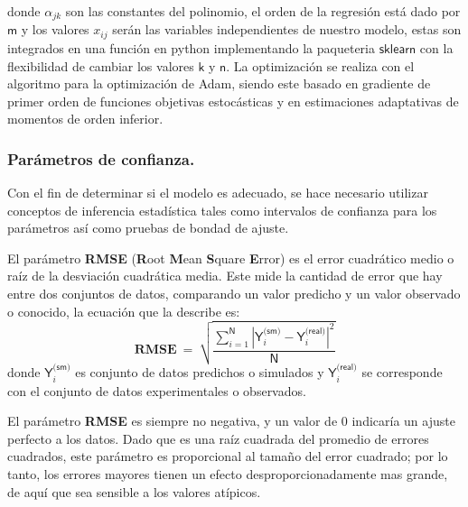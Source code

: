 donde $\alpha_{jk}$ son las constantes del polinomio, el orden de la regresión está dado por $\textsf{m}$ y los valores $x_{ij}$ serán las variables independientes de nuestro modelo, estas son integrados en una función en python implementando la paqueteria $\textsf{sklearn}$ con la flexibilidad de cambiar los valores $\textsf{k}$ y $\textsf{n}$. %
La optimización se realiza con el algoritmo para la optimización de Adam\citep{adam}, siendo este basado en gradiente de primer orden de funciones objetivas estocásticas y en estimaciones adaptativas de momentos de orden inferior.

\subsubsection{Parámetros de confianza.}
Con el fin de determinar si el modelo es adecuado, se hace necesario utilizar conceptos de inferencia estadística tales como intervalos de confianza para los parámetros así como pruebas de bondad de ajuste. 

El parámetro \textbf{RMSE} (\textbf{R}oot \textbf{M}ean \textbf{S}quare \textbf{E}rror) es el error cuadrático medio o raíz de la desviación cuadrática media. Este mide la cantidad de error que hay entre dos conjuntos de datos, comparando un valor predicho y un valor observado o conocido, la ecuación que la describe es:
\begin{equation}
\mathbf{RMSE} ~ = ~ \sqrt{\dfrac{\sum\limits_{i=1}^\textsf{N} |\textsf{Y}_{i}^\textsf{(sm)}  - \textsf{Y}_{i}^\textsf{(real)}|^2}{\textsf{N}}} 
\end{equation}
donde $\textsf{Y}_{i}^\textsf{(sm)}$  es conjunto de datos predichos o simulados y $\textsf{Y}_{i}^\textsf{(real)}$ se corresponde con el conjunto de datos experimentales o observados.

El parámetro \textbf{RMSE} es siempre no negativa, y un valor de $0$ indicaría un ajuste perfecto a los datos. Dado que es una raíz cuadrada del promedio de errores cuadrados, este parámetro es proporcional al tamaño del error cuadrado; por lo tanto, los errores mayores tienen un efecto desproporcionadamente mas grande, de aquí que sea sensible a los valores atípicos.

